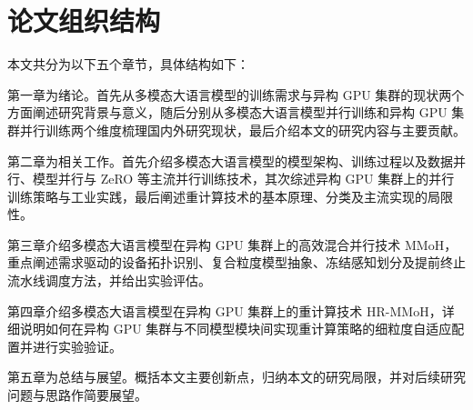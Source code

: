 \section{论文组织结构}

本文共分为以下五个章节，具体结构如下：

第一章为绪论。首先从多模态大语言模型的训练需求与异构 GPU 集群的现状两个方面阐述研究背景与意义，随后分别从多模态大语言模型并行训练和异构 GPU 集群并行训练两个维度梳理国内外研究现状，最后介绍本文的研究内容与主要贡献。

第二章为相关工作。首先介绍多模态大语言模型的模型架构、训练过程以及数据并行、模型并行与 ZeRO 等主流并行训练技术，其次综述异构 GPU 集群上的并行训练策略与工业实践，最后阐述重计算技术的基本原理、分类及主流实现的局限性。

第三章介绍多模态大语言模型在异构 GPU 集群上的高效混合并行技术 MMoH，重点阐述需求驱动的设备拓扑识别、复合粒度模型抽象、冻结感知划分及提前终止流水线调度方法，并给出实验评估。

第四章介绍多模态大语言模型在异构 GPU 集群上的重计算技术 HR-MMoH，详细说明如何在异构 GPU 集群与不同模型模块间实现重计算策略的细粒度自适应配置并进行实验验证。

第五章为总结与展望。概括本文主要创新点，归纳本文的研究局限，并对后续研究问题与思路作简要展望。
